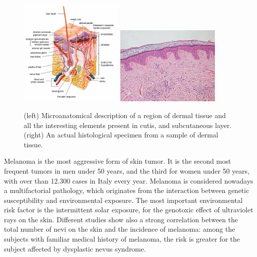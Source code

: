     \begin{figure}
        \centering
        \includegraphics[width = 0.45\textwidth]{images/derm_scheme}
        \includegraphics[width = 0.45\textwidth]{images/derm_specimen}

        \caption{(left) Microanatomical description of a region of dermal tissue and all the interesting elements present in cutis, and subcutaneous layer. (right) An actual histological specimen from a sample of dermal tissue.}
        \label{fig:derm_descr}
    \end{figure}

    Melanoma is the most aggressive form of skin tumor. It is the second most frequent tumors in men under 50 years, and the third for women under 50 years, with over than 12.300 cases in Italy every year. Melanoma is considered nowadays a multifactorial pathology, which originates from the interaction between genetic susceptibility and environmental exposure. The most important environmental risk factor is the intermittent solar exposure, for the genotoxic effect of ultraviolet rays on the skin. Different studies show also a strong correlation between the total number of nevi on the skin and the incidence of melanoma: among the subjects with familiar medical history of melanoma, the risk is greater for the subject affected by dysplastic nevus syndrome.
    
